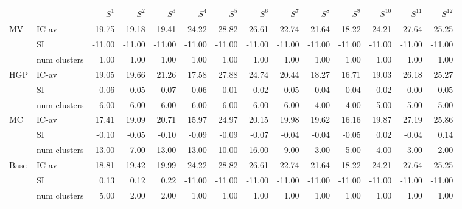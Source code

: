 \begin{tabular}{llrrrrrrrrrrrr}
\toprule
 &  & $S^{1}$ & $S^{2}$ & $S^{3}$ & $S^{4}$ & $S^{5}$ & $S^{6}$ & $S^{7}$ & $S^{8}$ & $S^{9}$ & $S^{10}$ & $S^{11}$ & $S^{12}$ \\
\midrule
\multirow[c]{3}{*}{MV} & IC-av & 19.75 & 19.18 & 19.41 & 24.22 & 28.82 & 26.61 & 22.74 & 21.64 & 18.22 & 24.21 & 27.64 & 25.25 \\
 & SI & -11.00 & -11.00 & -11.00 & -11.00 & -11.00 & -11.00 & -11.00 & -11.00 & -11.00 & -11.00 & -11.00 & -11.00 \\
 & num clusters & 1.00 & 1.00 & 1.00 & 1.00 & 1.00 & 1.00 & 1.00 & 1.00 & 1.00 & 1.00 & 1.00 & 1.00 \\
\multirow[c]{3}{*}{HGP} & IC-av & 19.05 & 19.66 & 21.26 & 17.58 & 27.88 & 24.74 & 20.44 & 18.27 & 16.71 & 19.03 & 26.18 & 25.27 \\
 & SI & -0.06 & -0.05 & -0.07 & -0.06 & -0.01 & -0.02 & -0.05 & -0.04 & -0.04 & -0.02 & 0.00 & -0.05 \\
 & num clusters & 6.00 & 6.00 & 6.00 & 6.00 & 6.00 & 6.00 & 6.00 & 4.00 & 4.00 & 5.00 & 5.00 & 5.00 \\
\multirow[c]{3}{*}{MC} & IC-av & 17.41 & 19.09 & 20.71 & 15.97 & 24.97 & 20.15 & 19.98 & 19.62 & 16.16 & 19.87 & 27.19 & 25.86 \\
 & SI & -0.10 & -0.05 & -0.10 & -0.09 & -0.09 & -0.07 & -0.04 & -0.04 & -0.05 & 0.02 & -0.04 & 0.14 \\
 & num clusters & 13.00 & 7.00 & 13.00 & 13.00 & 10.00 & 16.00 & 9.00 & 3.00 & 5.00 & 4.00 & 3.00 & 2.00 \\
\multirow[c]{3}{*}{Base} & IC-av & 18.81 & 19.42 & 19.99 & 24.22 & 28.82 & 26.61 & 22.74 & 21.64 & 18.22 & 24.21 & 27.64 & 25.25 \\
 & SI & 0.13 & 0.12 & 0.22 & -11.00 & -11.00 & -11.00 & -11.00 & -11.00 & -11.00 & -11.00 & -11.00 & -11.00 \\
 & num clusters & 5.00 & 2.00 & 2.00 & 1.00 & 1.00 & 1.00 & 1.00 & 1.00 & 1.00 & 1.00 & 1.00 & 1.00 \\
\bottomrule
\end{tabular}
